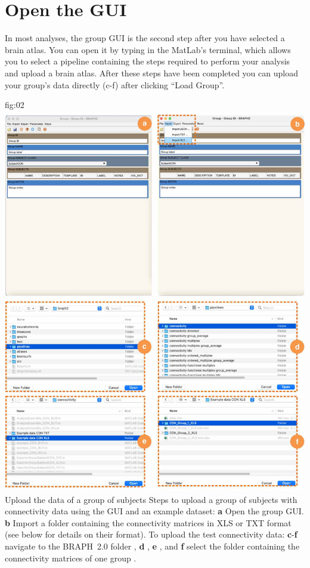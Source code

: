 \documentclass[justified]{tufte-handout}
\begin{document}
\section{Open the GUI}

In most analyses, the group GUI is the second step after you have selected a brain atlas. You can open it by typing  in the MatLab's terminal, which allows you to select a pipeline containing the steps required to perform your analysis and upload a brain atlas. After these steps have been completed you can upload your group's data directly (c-f) after clicking ``Load Group''. 

	{fig:02}
	{
	\includegraphics{fig02.jpg}
	}
	{Upload the data of a group of subjects}
	{
	Steps to upload a group of subjects with connectivity data using the GUI and an example dataset: 
	{\bf a} Open the group GUI.
	{\bf b} Import a folder containing the connectivity matrices in XLS or TXT format (see below for details on their format).
	To upload the test connectivity data:
	{\bf c}-{\bf f} navigate to the BRAPH~2.0 folder , {\bf d} ,  {\bf e} , and {\bf f} select the folder containing the connectivity matrices of one group .
	}
\end{document}
